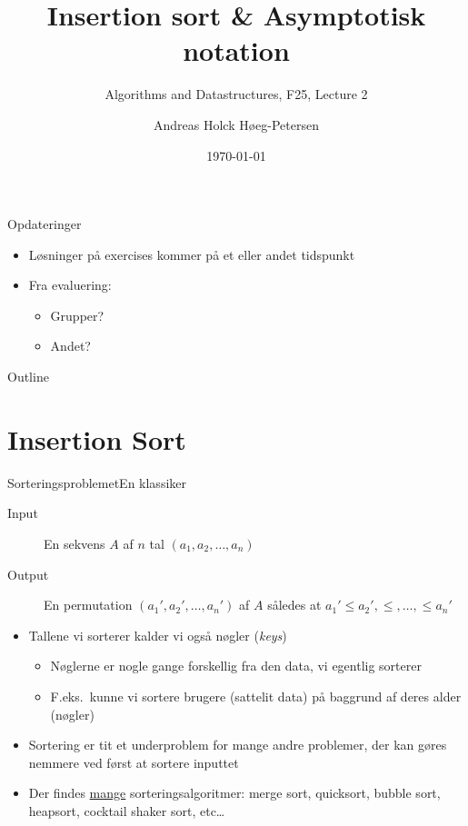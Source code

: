 \documentclass[aspectratio=1610]{beamer}
\title[ALG25 - Lecture 2]
{Insertion sort \& Asymptotisk notation}
\subtitle
{Algorithms and Datastructures, F25, Lecture 2}
\author[Andreas H. Høeg-Petersen]
{Andreas Holck Høeg-Petersen}
\institute[AAU]{%
  Department of Computer Science\\
  Aalborg University
}
\date {\today}
\begin{document}
\begin{frame}
  \titlepage
\end{frame}

\begin{frame}{Opdateringer}{}
    \begin{itemize}
        \item Løsninger på exercises kommer på et eller andet tidspunkt
        \item Fra evaluering:
            \begin{itemize}
                \item Grupper?
                \item Andet?
            \end{itemize}
    \end{itemize}
\end{frame}


\begin{frame}{Outline}
  \tableofcontents
\end{frame}


\section{Insertion Sort}

\begin{frame}{Sorteringsproblemet}{En klassiker}
    \begin{description}
        \item[Input] En sekvens $A$ af $n$ tal $(a_1, a_2, \ldots, a_n)$
        \item[Output] En permutation $(a_1', a_2', \ldots, a_n')$ af $A$ således
            at $a_1' \leq a_2', \leq, \ldots, \leq a_n'$ \pause
    \end{description}

    \begin{itemize}[<+->]
        \item Tallene vi sorterer kalder vi også \alert{nøgler} (\textit{keys})
            \begin{itemize}
                \item Nøglerne er nogle gange forskellig fra den data, vi
                    egentlig sorterer
                \item F.eks.\ kunne vi sortere brugere (\alert{sattelit data})
                    på baggrund af deres alder (\alert{nøgler})
            \end{itemize}
        \item Sortering er tit et underproblem for mange andre problemer, der
            kan gøres nemmere ved først at sortere inputtet
        \item Der findes \underline{mange} sorteringsalgoritmer: merge sort,
            quicksort, bubble sort, heapsort, cocktail shaker sort, etc\ldots
    \end{itemize}

\end{frame}
\end{document}
